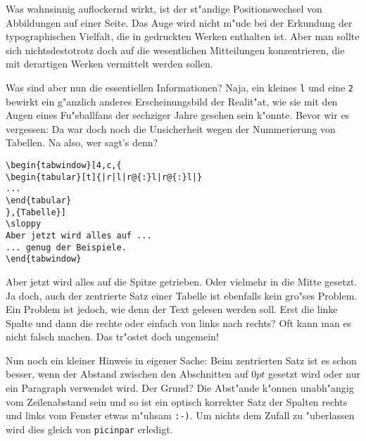 \documentclass[german,picinpar]{article}
\begin{document}
Was wahnsinnig auflockernd wirkt, ist der st"andige Positionswechsel
von Abbildungen auf einer Seite. Das Auge wird nicht m"ude bei
der Erkundung der typographischen Vielfalt, die in gedruckten
Werken enthalten ist. Aber man sollte sich nichtsdestotrotz doch
auf die wesentlichen Mitteilungen konzentrieren, die mit derartigen
Werken vermittelt werden sollen.

Was sind aber nun die essentiellen Informationen? Naja, ein kleines
{\tt l} und eine {\tt 2} bewirkt ein g"anzlich anderes Erscheinungsbild
der Realit"at, wie sie mit den Augen eines Fu"sballfans der sechziger
Jahre gesehen sein k"onnte. Bevor wir es vergessen: Da war doch noch
die Unsicherheit wegen der Nummerierung von Tabellen. Na also, wer
sagt's denn?
\end{tabwindow}

\begin{verbatim}
\begin{tabwindow}[4,c,{
\begin{tabular}[t]{|r|l|r@{:}l|r@{:}l|}
...
\end{tabular}
},{Tabelle}]
\sloppy
Aber jetzt wird alles auf ...
... genug der Beispiele.
\end{tabwindow}
\end{verbatim}

\sloppy
Aber jetzt wird alles auf die Spitze getrieben. Oder vielmehr
in die Mitte gesetzt. Ja doch, auch der zentrierte Satz einer Tabelle
ist ebenfalls kein gro"ses Problem. Ein Problem ist jedoch, wie denn
der Text gelesen werden soll. Erst die linke Spalte und dann die
rechte oder einfach von links nach rechts? Oft kann man es nicht
falsch machen. Das tr"ostet doch ungemein!

Nun noch ein kleiner Hinweis in eigener Sache:
Beim zentrierten Satz ist es schon besser, wenn der Abstand zwischen
den Abschnitten auf $0pt$ gesetzt wird oder nur ein Paragraph verwendet
wird. Der Grund? Die Abst"ande k"onnen unabh"angig vom Zeilenabstand
sein und so ist ein optisch korrekter Satz der Spalten rechts und
links vom Fenster etwas m"uhsam {\tt :-)}. Um nichts dem Zufall zu
"uberlassen wird dies gleich von {\tt picinpar} erledigt.
\end{tabwindow}
\end{document}
